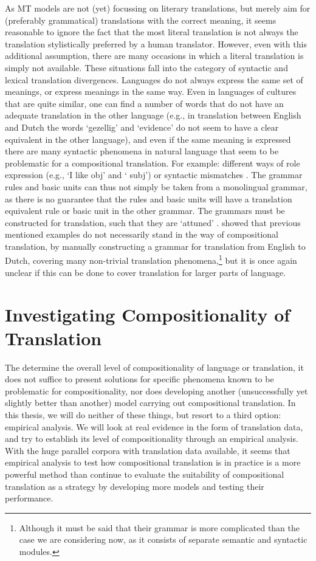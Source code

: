As MT models are not (yet) focussing on literary translations, but merely aim for (preferably grammatical) translations with the correct meaning, it seems reasonable to ignore the fact that the most literal translation is not always the translation stylistically preferred by a human translator. However, even with this additional assumption, there are many occasions in which a literal translation is simply not available. These situations fall into the category of  syntactic and lexical translation divergences. Languages do not always express the same set of meanings, or express meanings in the same way. Even in languages of cultures that are quite similar, one can find a number of words that do not have an adequate translation in the other language (e.g., in translation between English and Dutch the words `gezellig' and `evidence' do not seem to have a clear equivalent in the other language), and even if the same meaning is expressed there are many syntactic phenomena in natural language that seem to be problematic for a compositional translation. For example: different ways of role expression (e.g., `I like obj' and ` subj') or syntactic mismatches \citep[e.g., `woonachtig zijn' and its translation `reside',][]{landsbergen1989power}. The grammar rules and basic units can thus not simply be taken from a monolingual grammar, as there is no guarantee that the rules and basic units will have a translation equivalent rule or basic unit in the other grammar. The grammars must be constructed for translation, such that they are `attuned' \citep{rosetta1994compositional}. \cite{rosetta1994compositional} showed that previous mentioned examples do not necessarily stand in the way of compositional translation, by manually constructing a grammar for translation from English to Dutch, covering many non-trivial translation phenomena,\footnote{Although it must be said that their grammar is more complicated than the case we are considering now, as it consists of separate semantic and syntactic modules.} but it is once again unclear if this can be done to cover translation for larger parts of language.
 
 
\section{Investigating Compositionality of Translation}
\label{sec:invest}

The determine the overall level of compositionality of language or translation, it does not suffice to present solutions for specific phenomena known to be problematic for compositionality, nor does developing another (unsuccessfully yet slightly better than another) model carrying out compositional translation. In this thesis, we will do neither of these things, but resort to a third option: empirical analysis. We will look at real evidence in the form of translation data, and try to establish its level of compositionality through an empirical analysis. With the huge parallel corpora with translation data available, it seems that empirical analysis to test how compositional translation is in practice is a more powerful method than continue to evaluate the suitability of compositional translation as a strategy by developing more models and testing their performance. 

